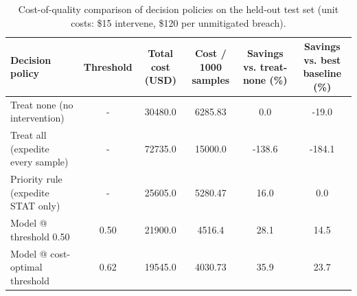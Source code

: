 \begin{table}[!t]
\centering
\caption{Cost-of-quality comparison of decision policies on the held-out test set (unit costs: \$15 intervene, \$120 per unmitigated breach).}
\label{tab:cost}
\begin{tabular}{lccccc}
\hline
Decision policy & Threshold & Total cost (USD) & Cost / 1000 samples & Savings vs. treat-none (\%) & Savings vs. best baseline (\%) \\
\hline
Treat none (no intervention) & - & 30480.0 & 6285.83 & 0.0 & -19.0 \\
Treat all (expedite every sample) & - & 72735.0 & 15000.0 & -138.6 & -184.1 \\
Priority rule (expedite STAT only) & - & 25605.0 & 5280.47 & 16.0 & 0.0 \\
Model @ threshold 0.50 & 0.50 & 21900.0 & 4516.4 & 28.1 & 14.5 \\
Model @ cost-optimal threshold & 0.62 & 19545.0 & 4030.73 & 35.9 & 23.7 \\
\hline
\end{tabular}
\end{table}
